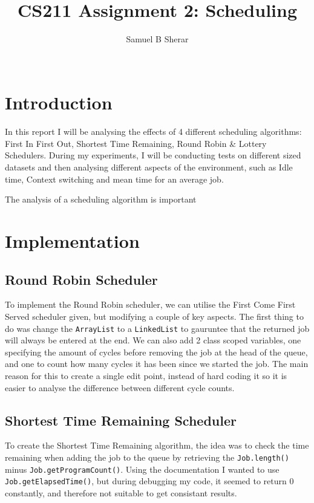 \documentclass{acm_proc_article-sp}
\begin{document}
\title{CS211 Assignment 2: Scheduling}
\author{
  \alignauthor 
  Samuel B Sherar\\
  \
}

\maketitle

\section{Introduction}
In this report I will be analysing the effects of 4 different scheduling algorithms: First In First Out, Shortest Time Remaining, Round Robin \& Lottery Schedulers. During my experiments, I will be conducting tests on different sized datasets and then analysing different aspects of the environment, such as Idle time, Context switching and mean time for an average job.

The analysis of a scheduling algorithm is important 

\section{Implementation}

\subsection{Round Robin Scheduler}

To implement the Round Robin scheduler, we can utilise the First Come First Served scheduler given, but modifying a couple of key aspects. The first thing to do was change the \texttt{ArrayList} to a \texttt{LinkedList} to gauruntee that the returned job will always be entered at the end. We can also add 2 class scoped variables, one specifying the amount of cycles before removing the job at the head of the queue, and one to count how many cycles it has been since we started the job. The main reason for this to create a single edit point, instead of hard coding it so it is easier to analyse the difference between different cycle counts.

\subsection{Shortest Time Remaining Scheduler}

To create the Shortest Time Remaining algorithm, the idea was to check the time remaining when adding the job to the queue by retrieving the \texttt{Job.length()} minus \texttt{Job.get\-ProgramCount()}. Using the documentation I wanted to use \texttt{Job.getElapsedTime()}, but during debugging my code, it seemed to return 0 constantly, and therefore not suitable to get consistant results.
\end{document}
